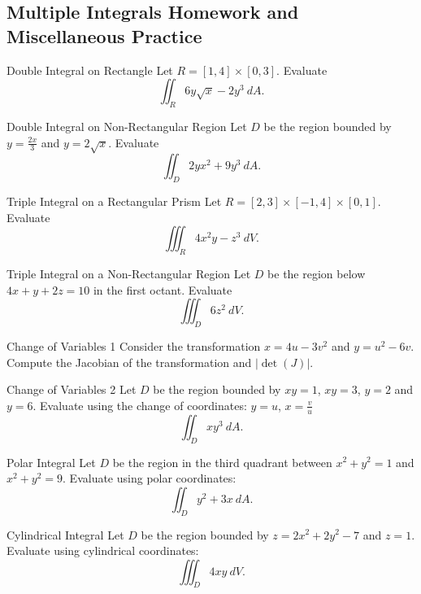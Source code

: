 \renewcommand\thesubsection{\thesection.\Alph{subsection}}
\setcounter{subsection}{17}
\subsection{Multiple Integrals Homework and Miscellaneous Practice}

\begin{pexercise}{Double Integral on Rectangle}
Let $R=[1,4]\times[0,3]$. Evaluate $$\iint_R 6y\sqrt{x}-2y^3 \ dA .$$
\end{pexercise}

\begin{pexercise}{Double Integral on Non-Rectangular Region}
Let $D$ be the region bounded by $y=\frac{2x}{3}$ and $y=2\sqrt{x}$. Evaluate $$\iint_D 2yx^2+9y^3 \ dA.$$
\end{pexercise}

\begin{pexercise}{Triple Integral on a Rectangular Prism}
Let $R=[2,3]\times[-1,4]\times[0,1]$. Evaluate $$\iiint_R 4x^2y-z^3 \ dV .$$
\end{pexercise}

\begin{pexercise}{Triple Integral on a Non-Rectangular Region}
Let $D$ be the region below $4x+y+2z=10$ in the first octant. Evaluate $$\iiint_D 6z^2 \ dV .$$
\end{pexercise}

\begin{pexercise}{Change of Variables 1}
Consider the transformation $x=4u-3v^2$ and $y=u^2-6v$. Compute the Jacobian of the transformation and $|\det(J)|$.
\end{pexercise}

\begin{pexercise}{Change of Variables 2}
Let $D$ be the region bounded by $xy=1$, $xy=3$, $y=2$ and $y=6$. Evaluate using the change of coordinates: $y=u$, $x=\frac{v}{u}$  $$\iint_D xy^3 \ dA .$$
\end{pexercise}

\begin{pexercise}{Polar Integral}
Let $D$ be the region in the third quadrant between $x^2+y^2=1$ and $x^2+y^2=9$. Evaluate using polar coordinates: $$\iint_D y^2+3x\ dA .$$
\end{pexercise}

\begin{pexercise}{Cylindrical Integral}
Let $D$ be the region bounded by $z=2x^2+2y^2-7$ and $z=1$. Evaluate using cylindrical coordinates: $$\iiint_D 4xy \ dV .$$
\end{pexercise}

